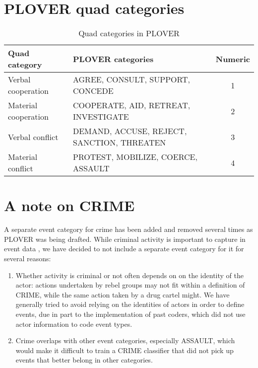 \documentclass[11pt]{report}
\newcommand{\plcat}[1]{\textsf{#1}}
\begin{document}
{%

\section{PLOVER quad categories}

\begin{table}[htp]
\caption{Quad categories in PLOVER}
\begin{center}
\begin{tabular}{|l|l|c|}
\hline
Quad category & PLOVER categories & Numeric\\
\hline
Verbal cooperation & AGREE, CONSULT, SUPPORT, CONCEDE &  1 \\
Material cooperation & COOPERATE, AID, RETREAT, INVESTIGATE & 2 \\
Verbal conflict & DEMAND, ACCUSE, REJECT, SANCTION, THREATEN & 3\\
Material conflict & PROTEST,  MOBILIZE, COERCE, ASSAULT & 4\\
\hline

\end{tabular}
\end{center}
\label{default}
\end{table}

\section{A note on \plcat{CRIME}}

A separate event category for crime has been added and removed several times as PLOVER was being drafted. While criminal activity is important to capture in event data \citep{osorio2015contagion, osorio2017supervised}, we have decided to not include a separate event category for it for several reasons:

\begin{enumerate}

	\item Whether activity is criminal or not often depends on on the identity of the actor: actions undertaken by rebel groups may not fit within a definition of \plcat{CRIME}, while the same action taken by a drug cartel might. We have generally tried to avoid relying on the identities of actors in order to define events, due in part to the implementation of past coders, which did not use actor information to code event types. 

	\item Crime overlaps with other event categories, especially \plcat{ASSAULT}, which would make it difficult to train a \plcat{CRIME} classifier that did not pick up events that better belong in other categories.
\end{enumerate}


}
\end{document}
